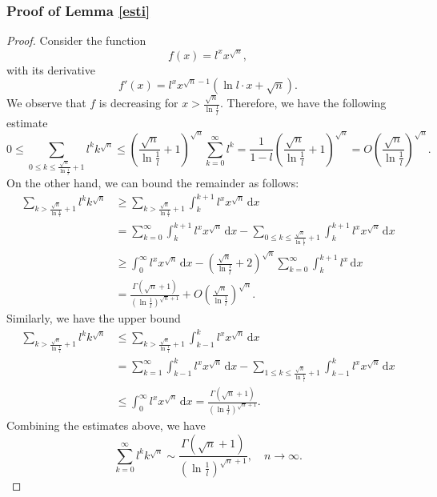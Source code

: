 \documentclass{article} %
\begin{document}
\subsubsection{Proof of Lemma \ref{esti}}
\begin{proof}
    Consider the function
\[
f(x) = l^x x^{\sqrt{n}},
\]
with its derivative
\[
f'(x) = l^x x^{\sqrt{n} - 1} (\ln l \cdot x + \sqrt{n}).
\]
We observe that \( f \) is decreasing for \( x > \frac{\sqrt{n}}{\ln \frac{1}{l}} \). Therefore, we have the following estimate
\[
0 \leq \sum_{0 \leq k \leq \frac{\sqrt{n}}{\ln \frac{1}{l}} + 1} l^k k^{\sqrt{n}} \leq \left( \frac{\sqrt{n}}{\ln \frac{1}{l}} + 1 \right)^{\sqrt{n}} \sum_{k=0}^{\infty} l^k = \frac{1}{1 - l} \left( \frac{\sqrt{n}}{\ln \frac{1}{l}} + 1 \right)^{\sqrt{n}} = O\left( \frac{\sqrt{n}}{\ln \frac{1}{l}} \right)^{\sqrt{n}}.
\]
On the other hand, we can bound the remainder as follows:
\[
\begin{aligned}
\sum_{k > \frac{\sqrt{n}}{\ln \frac{1}{l}} + 1} l^k k^{\sqrt{n}} &\geq \sum_{k > \frac{\sqrt{n}}{\ln \frac{1}{l}} + 1} \int_{k}^{k+1} l^x x^{\sqrt{n}} \, \mathrm{d}x \\
&= \sum_{k=0}^{\infty} \int_{k}^{k+1} l^x x^{\sqrt{n}} \, \mathrm{d}x - \sum_{0 \leq k \leq \frac{\sqrt{n}}{\ln \frac{1}{l}} + 1} \int_{k}^{k+1} l^x x^{\sqrt{n}} \, \mathrm{d}x \\
&\geq \int_{0}^{\infty} l^x x^{\sqrt{n}} \, \mathrm{d}x - \left( \frac{\sqrt{n}}{\ln \frac{1}{l}} + 2 \right)^{\sqrt{n}} \sum_{k=0}^{\infty} \int_{k}^{k+1} l^x \, \mathrm{d}x \\
&= \frac{\Gamma\left( \sqrt{n} + 1 \right)}{\left( \ln \frac{1}{l} \right)^{\sqrt{n} + 1}} + O\left( \frac{\sqrt{n}}{\ln \frac{1}{l}} \right)^{\sqrt{n}}.
\end{aligned}
\]
Similarly, we have the upper bound
\[
\begin{aligned}
\sum_{k > \frac{\sqrt{n}}{\ln \frac{1}{l}} + 1} l^k k^{\sqrt{n}} &\leq \sum_{k > \frac{\sqrt{n}}{\ln \frac{1}{l}} + 1} \int_{k-1}^{k} l^x x^{\sqrt{n}} \, \mathrm{d}x \\
&= \sum_{k=1}^{\infty} \int_{k-1}^{k} l^x x^{\sqrt{n}} \, \mathrm{d}x - \sum_{1 \leq k \leq \frac{\sqrt{n}}{\ln \frac{1}{l}} + 1} \int_{k-1}^{k} l^x x^{\sqrt{n}} \, \mathrm{d}x \\
&\leq \int_{0}^{\infty} l^x x^{\sqrt{n}} \, \mathrm{d}x = \frac{\Gamma\left( \sqrt{n} + 1 \right)}{\left( \ln \frac{1}{l} \right)^{\sqrt{n} + 1}}.
\end{aligned}
\]
Combining the estimates above, we have
\[
\sum_{k=0}^{\infty} l^k k^{\sqrt{n}} \sim \frac{\Gamma\left( \sqrt{n} + 1 \right)}{\left( \ln \frac{1}{l} \right)^{\sqrt{n} + 1}}, \quad n \to \infty. \tag*{\qedhere}
\]
\end{proof}
\end{document}
